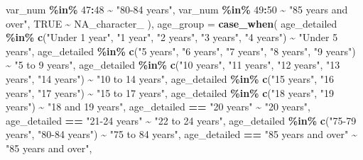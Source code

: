 \documentclass[
]{article}
\newenvironment{Shaded}{\begin{snugshade}}{\end{snugshade}}
\newcommand{\AttributeTok}[1]{\textcolor[rgb]{0.13,0.29,0.53}{#1}}
\newcommand{\ConstantTok}[1]{\textcolor[rgb]{0.56,0.35,0.01}{#1}}
\newcommand{\DecValTok}[1]{\textcolor[rgb]{0.00,0.00,0.81}{#1}}
\newcommand{\FunctionTok}[1]{\textcolor[rgb]{0.13,0.29,0.53}{\textbf{#1}}}
\newcommand{\NormalTok}[1]{#1}
\newcommand{\SpecialCharTok}[1]{\textcolor[rgb]{0.81,0.36,0.00}{\textbf{#1}}}
\newcommand{\StringTok}[1]{\textcolor[rgb]{0.31,0.60,0.02}{#1}}
\begin{document}
\begin{Shaded}
\begin{Highlighting}[]
\NormalTok{      var\_num }\SpecialCharTok{\%in\%} \DecValTok{47}\SpecialCharTok{:}\DecValTok{48} \SpecialCharTok{\textasciitilde{}} \StringTok{"80{-}84 years"}\NormalTok{,}
\NormalTok{      var\_num }\SpecialCharTok{\%in\%} \DecValTok{49}\SpecialCharTok{:}\DecValTok{50} \SpecialCharTok{\textasciitilde{}} \StringTok{"85 years and over"}\NormalTok{,}
      \ConstantTok{TRUE} \SpecialCharTok{\textasciitilde{}} \ConstantTok{NA\_character\_}
\NormalTok{    ),}
    \AttributeTok{age\_group =} \FunctionTok{case\_when}\NormalTok{(}
\NormalTok{      age\_detailed }\SpecialCharTok{\%in\%} \FunctionTok{c}\NormalTok{(}\StringTok{"Under 1 year"}\NormalTok{, }\StringTok{"1 year"}\NormalTok{, }\StringTok{"2 years"}\NormalTok{, }\StringTok{"3 years"}\NormalTok{, }\StringTok{"4 years"}\NormalTok{) }\SpecialCharTok{\textasciitilde{}} \StringTok{"Under 5 years"}\NormalTok{,}
\NormalTok{      age\_detailed }\SpecialCharTok{\%in\%} \FunctionTok{c}\NormalTok{(}\StringTok{"5 years"}\NormalTok{, }\StringTok{"6 years"}\NormalTok{, }\StringTok{"7 years"}\NormalTok{, }\StringTok{"8 years"}\NormalTok{, }\StringTok{"9 years"}\NormalTok{) }\SpecialCharTok{\textasciitilde{}} \StringTok{"5 to 9 years"}\NormalTok{,}
\NormalTok{      age\_detailed }\SpecialCharTok{\%in\%} \FunctionTok{c}\NormalTok{(}\StringTok{"10 years"}\NormalTok{, }\StringTok{"11 years"}\NormalTok{, }\StringTok{"12 years"}\NormalTok{, }\StringTok{"13 years"}\NormalTok{, }\StringTok{"14 years"}\NormalTok{) }\SpecialCharTok{\textasciitilde{}} \StringTok{"10 to 14 years"}\NormalTok{,}
\NormalTok{      age\_detailed }\SpecialCharTok{\%in\%} \FunctionTok{c}\NormalTok{(}\StringTok{"15 years"}\NormalTok{, }\StringTok{"16 years"}\NormalTok{, }\StringTok{"17 years"}\NormalTok{) }\SpecialCharTok{\textasciitilde{}} \StringTok{"15 to 17 years"}\NormalTok{,}
\NormalTok{      age\_detailed }\SpecialCharTok{\%in\%} \FunctionTok{c}\NormalTok{(}\StringTok{"18 years"}\NormalTok{, }\StringTok{"19 years"}\NormalTok{) }\SpecialCharTok{\textasciitilde{}} \StringTok{"18 and 19 years"}\NormalTok{,}
\NormalTok{      age\_detailed }\SpecialCharTok{==} \StringTok{"20 years"} \SpecialCharTok{\textasciitilde{}} \StringTok{"20 years"}\NormalTok{,}
\NormalTok{      age\_detailed }\SpecialCharTok{==} \StringTok{"21{-}24 years"} \SpecialCharTok{\textasciitilde{}} \StringTok{"22 to 24 years"}\NormalTok{,}
\NormalTok{      age\_detailed }\SpecialCharTok{\%in\%} \FunctionTok{c}\NormalTok{(}\StringTok{"75{-}79 years"}\NormalTok{, }\StringTok{"80{-}84 years"}\NormalTok{) }\SpecialCharTok{\textasciitilde{}} \StringTok{"75 to 84 years"}\NormalTok{,}
\NormalTok{      age\_detailed }\SpecialCharTok{==} \StringTok{"85 years and over"} \SpecialCharTok{\textasciitilde{}} \StringTok{"85 years and over"}\NormalTok{,}

\end{Highlighting}
\end{Shaded}
\end{document}
